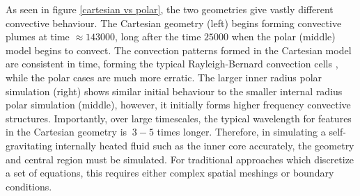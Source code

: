 \documentclass{article}
\begin{document}
\noindent As seen in figure \ref{cartesian vs polar}, the two geometries give vastly different convective behaviour. The Cartesian geometry (left) begins forming 
convective plumes at time $\approx 143000$, long after the time $25000$ when the polar (middle) model begins to convect. The convection patterns formed 
in the Cartesian model are consistent in time, forming the typical Rayleigh-Bernard convection cells \cite{tritton2012physical}, while the polar cases are much more erratic. The larger inner radius polar simulation (right) shows similar initial behaviour to the smaller internal radius polar simulation (middle), however, it initially forms higher frequency convective structures. Importantly, over large timescales, the typical wavelength for features in the Cartesian geometry is $~3-5$ times longer. Therefore, in simulating a self-gravitating internally heated fluid such as the inner core accurately, the geometry and central region must be simulated. For traditional approaches which discretize a set of equations, this requires either complex spatial meshings or boundary conditions. 
\end{document}
